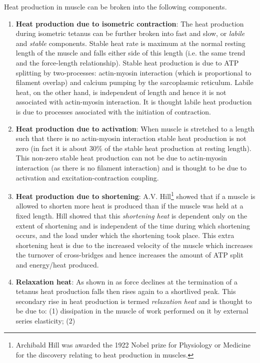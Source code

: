 Heat production in muscle can be broken into the following components.
\begin{enumerate}
\item \textbf{Heat production due to isometric contraction}: The heat production
  during isometric tetanus can be further broken into fast and slow, or
  \emph{labile} and \emph{stable} components. Stable heat rate is maximum at
  the normal resting length of the muscle and falls either side of this length
  (i.e. the same trend and the force-length relationship). Stable heat
  production is due to ATP splitting by two-processes: actin-myosin
  interaction (which is proportional to filament overlap) and calcium pumping
  by the sarcoplasmic reticulum. Labile heat, on the other hand, is
  independent of length and hence it is not associated with actin-myosin
  interaction. It is thought labile heat production is due to processes
  associated with the initiation of contraction.
\item \textbf{Heat production due to activation}: When muscle is stretched to a
  length such that there is no actin-myosin interaction stable heat production
  is not zero (in fact it is about 30\% of the stable heat production at
  resting length). This non-zero stable heat production can not be due to
  actin-myosin interaction (as there is no filament interaction) and is
  thought to be due to activation and excitation-contraction coupling.
\item \textbf{Heat production due to shortening}: A.V. Hill\footnote{Archibald
    Hill was awarded the 1922 Nobel prize for Physiology or Medicine for the
    discovery relating to heat production in muscles.} showed that if a muscle
  is allowed to shorten more heat is produced than if the muscle was held at a
  fixed length. Hill showed that this \emph{shortening heat} is dependent only
  on the extent of shortening and is independent of the time during which
  shortening occurs, and the load under which the shortening took place. This
  extra shortening heat is due to the increased velocity of the muscle which
  increases the turnover of cross-bridges and hence increases the amount of
  ATP split and energy/heat produced.
\item \textbf{Relaxation heat}: As shown in  as force
  declines at the termination of a tetanus heat production falls then rises
  again to a shortlived peak. This secondary rise in heat production is termed
  \emph{relaxation heat} and is thought to be due to: (1) dissipation in the
  muscle of work performed on it by external series elasticity; (2)

\end{enumerate}
